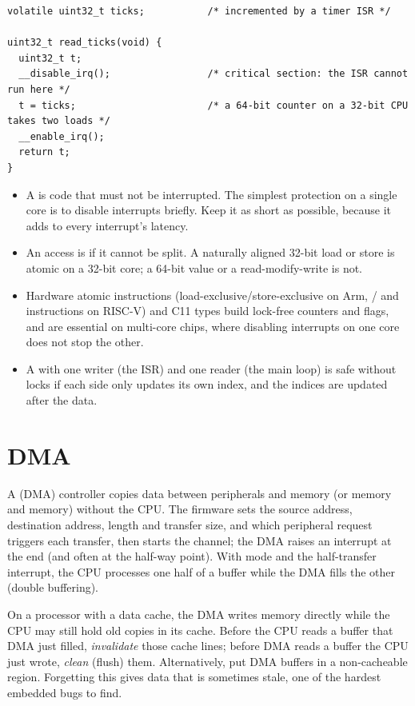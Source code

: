 \begin{lstlisting}
volatile uint32_t ticks;           /* incremented by a timer ISR */

uint32_t read_ticks(void) {
  uint32_t t;
  __disable_irq();                 /* critical section: the ISR cannot run here */
  t = ticks;                       /* a 64-bit counter on a 32-bit CPU takes two loads */
  __enable_irq();
  return t;
}
\end{lstlisting}

\begin{itemize}
  \item A  is code that must not be interrupted. The simplest protection on a single core is to disable interrupts briefly. Keep it as short as possible, because it adds to every interrupt's latency.
  \item An access is  if it cannot be split. A naturally aligned 32-bit load or store is atomic on a 32-bit core; a 64-bit value or a read-modify-write is not.
  \item Hardware atomic instructions (load-exclusive/store-exclusive on Arm, / and  instructions on RISC-V) and C11  types build lock-free counters and flags, and are essential on multi-core chips, where disabling interrupts on one core does not stop the other.
  \item A  with one writer (the ISR) and one reader (the main loop) is safe without locks if each side only updates its own index, and the indices are updated after the data.
\end{itemize}

\section{DMA}

A  (DMA) controller copies data between peripherals and memory (or memory and memory) without the CPU. The firmware sets the source address, destination address, length and transfer size, and which peripheral request triggers each transfer, then starts the channel; the DMA raises an interrupt at the end (and often at the half-way point). With  mode and the half-transfer interrupt, the CPU processes one half of a buffer while the DMA fills the other (double buffering).

\begin{trap}
On a processor with a data cache, the DMA writes memory directly while the CPU may still hold old copies in its cache. Before the CPU reads a buffer that DMA just filled, \emph{invalidate} those cache lines; before DMA reads a buffer the CPU just wrote, \emph{clean} (flush) them. Alternatively, put DMA buffers in a non-cacheable region. Forgetting this gives data that is sometimes stale, one of the hardest embedded bugs to find.
\end{trap}

